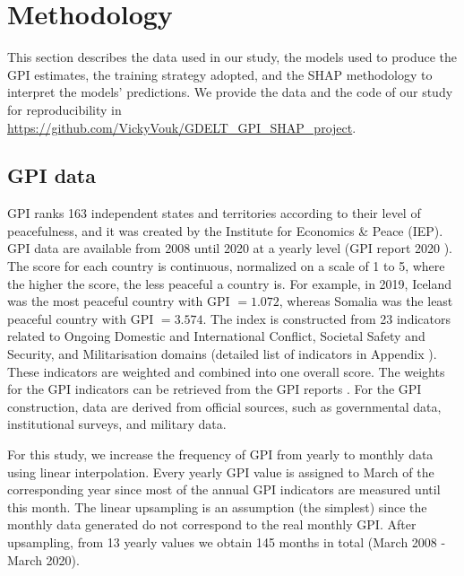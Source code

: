 \documentclass{bmcart}
\begin{document}
\section{Methodology}
\label{methodology}
This section describes the data used in our study, the models used to produce the GPI estimates, the training strategy adopted, and the SHAP methodology to interpret the models' predictions.
We provide the data and the code of our study for reproducibility in \url{https://github.com/VickyVouk/GDELT_GPI_SHAP_project}.



\subsection{GPI data}
\label{section:GPI_description}
GPI \cite{gpi_site} ranks 163 independent states and territories according to their level of peacefulness, and it was created by the Institute for Economics \& Peace (IEP). 
GPI data are available from 2008 until 2020 at a yearly level (GPI report 2020 \cite{gpi_report_2020}). 
The score for each country is continuous, normalized on a scale of 1 to 5, where the higher the score, the less peaceful a country is. 
For example, in 2019, Iceland was the most peaceful country with GPI $=1.072$, whereas Somalia was the least peaceful country with GPI $=3.574$. 
The index is constructed from 23 indicators related to Ongoing Domestic and International Conflict, Societal Safety and Security, and Militarisation domains \cite{gpi_report_2020} (detailed list of indicators in Appendix ). These indicators are weighted and combined into one overall score. The weights for the GPI indicators can be retrieved from the GPI reports \cite{gpi_report_2020}.
For the GPI construction, data are derived from official sources, such as governmental data, institutional surveys, and military data. 

For this study, we increase the frequency of GPI from yearly to monthly data using linear interpolation. 
Every yearly GPI value is assigned to March of the corresponding year since most of the annual GPI indicators are measured until this month.
The linear upsampling is an assumption (the simplest) since the monthly data generated do not correspond to the real monthly GPI. 
After upsampling, from 13 yearly values we obtain 145 months in total (March 2008 - March 2020). 
\end{document}
